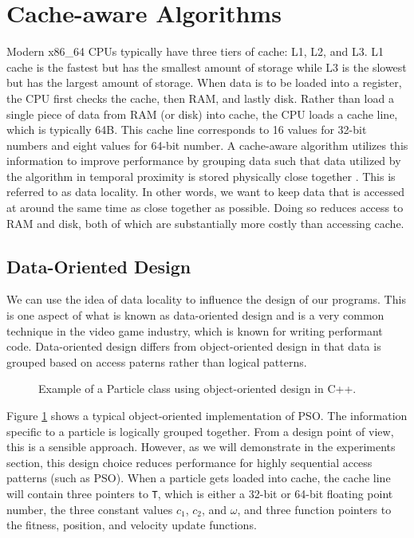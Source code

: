 \section{Cache-aware Algorithms}\label{sec:cache}
Modern x86\_64 CPUs typically have three tiers of cache: L1, L2, and
L3. L1 cache is the fastest but has the smallest amount of storage while L3 is the
slowest but has the largest amount of storage.
When data is to be loaded into a register, the CPU first checks the
cache, then RAM, and lastly disk. Rather than load a single piece of data from
RAM (or disk) into cache, the CPU loads a cache line, which is typically
64B. This cache line corresponds to 16 values for 32-bit
numbers  and eight values for 64-bit number.
A cache-aware
algorithm utilizes this information to improve performance by grouping data such that data utilized by
the algorithm in temporal proximity is stored physically close together \cite{scientific-software}. This
is referred to as data locality. In other words, we want to keep data that is
accessed at around the same time as close together as possible. Doing so reduces
access to RAM and disk, both of which are substantially more
costly than accessing cache.

\subsection{Data-Oriented Design}
We can use the idea of data locality to
influence the design of our programs. This is one aspect of what is known as
data-oriented design\cite{dod} and
is a very common technique in the video game industry, which is known for
writing performant code.
Data-oriented design
differs from object-oriented design in that data is grouped based on access
paterns rather than logical patterns.

\begin{figure}
  
  \caption{Example of a Particle class using object-oriented
    design in C++.}\label{fig:particle}
\end{figure}

Figure \ref{fig:particle} shows a typical object-oriented implementation of PSO.
The information specific to a particle is logically grouped together. From a
design point of view, this is a sensible approach. However, as we will
demonstrate in the experiments section, this design choice reduces performance
for highly sequential access patterns (such as PSO).
When a particle gets loaded into cache, the
cache line will contain three pointers to \texttt{T}, which is either a
32-bit or 64-bit floating point number, the three constant values
$c_1$, $c_2$, and $\omega$, and three function pointers to the fitness,
position, and velocity update functions.

